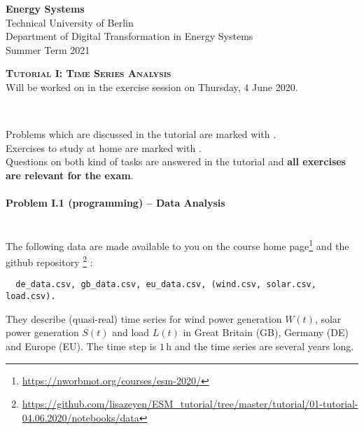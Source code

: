 \documentclass[11pt,a4paper,fleqn]{scrartcl}
\newcommand{\e}[1]{\ensuremath{\,\mathrm{#1}}}
\begin{document}
\begin{flushright}
 \textbf{Energy Systems}\\
 {\small Technical University of Berlin}\\
 {\small Department of Digital Transformation in Energy Systems}\\
 {\small Summer Term 2021}\\
\end{flushright}

 
 \vspace{-0.5em}
 \hrulefill
 \vspace{0.3em}

\begin{center}
 \textbf{\textsc{\Large Tutorial I: Time Series Analysis}}\\
 \small Will be worked on in the exercise session on Thursday, 4 June 2020.\\[1.5em]
\end{center}

\vspace{-0.8em}
\hrulefill
\vspace{0.8em} \\
\begin{tcolorbox}
Problems which are discussed in the tutorial are marked with \faGroup. \\
Exercises to study at home are marked with \faHome. \\
Questions on both kind of tasks are answered in the tutorial and \textbf{all exercises are relevant for the exam}.
\end{tcolorbox}
\paragraph{Problem I.1 (programming) -- Data Analysis \faGroup}~\\

The following data are made available to you on the course home
page\footnote{\url{https://nworbmot.org/courses/esm-2020/}} and the github repository \footnote{\url{https://github.com/lisazeyen/ESM_tutorial/tree/master/tutorial/01-tutorial-04.06.2020/notebooks/data}} :
\begin{verbatim}
  de_data.csv, gb_data.csv, eu_data.csv, (wind.csv, solar.csv, load.csv).
\end{verbatim}
They describe (quasi-real) time series for wind power generation \(W(t)\), solar power generation \(S(t)\) and load \(L(t)\) in Great Britain (GB), Germany (DE) and Europe (EU). The time step is \(1\e{h}\) and the time series are several years long.
\end{document}
